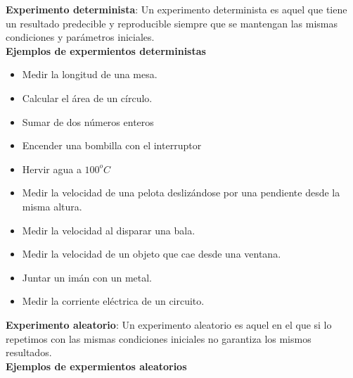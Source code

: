 \noindent \textbf{Experimento determinista}: Un experimento determinista es aquel que tiene un resultado predecible y reproducible siempre que se mantengan las mismas condiciones y parámetros iniciales. \\

\noindent \textbf{Ejemplos de expermientos deterministas}

\begin{itemize}
    \item Medir la longitud de una mesa.

    \item Calcular el área de un círculo.

    \item Sumar de dos números enteros

    \item Encender una bombilla con el interruptor

    \item Hervir agua a $100 ^{o}C$ 

    \item Medir la velocidad de una pelota deslizándose por una pendiente desde la misma altura.

    \item Medir la velocidad al disparar una bala.

    \item Medir la velocidad de un objeto que cae desde una ventana.

    \item Juntar un imán con un metal.

    \item Medir la corriente eléctrica de un circuito.
\end{itemize}

\noindent \textbf{Experimento aleatorio}: Un experimento aleatorio es aquel en el que si lo repetimos con las mismas condiciones iniciales no garantiza los mismos resultados. \\

\noindent \textbf{Ejemplos de expermientos aleatorios}

